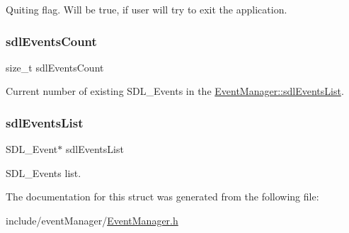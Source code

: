 Quiting flag. Will be true, if user will try to exit the application. \hypertarget{struct_event_manager_a2ef8242634939408c466f0f3f221b1cb}{}\label{struct_event_manager_a2ef8242634939408c466f0f3f221b1cb} 
\subsubsection{\texorpdfstring{sdl\+Events\+Count}{sdlEventsCount}}
{\footnotesize\ttfamily size\+\_\+t sdl\+Events\+Count}

Current number of existing S\+D\+L\+\_\+\+Events in the \hyperlink{struct_event_manager_ac563054d2cefbd8d20b1daf70eb35d78}{Event\+Manager\+::sdl\+Events\+List}. \hypertarget{struct_event_manager_ac563054d2cefbd8d20b1daf70eb35d78}{}\label{struct_event_manager_ac563054d2cefbd8d20b1daf70eb35d78} 
\subsubsection{\texorpdfstring{sdl\+Events\+List}{sdlEventsList}}
{\footnotesize\ttfamily S\+D\+L\+\_\+\+Event$\ast$ sdl\+Events\+List}

S\+D\+L\+\_\+\+Events list. 

The documentation for this struct was generated from the following file\+:\begin{DoxyCompactItemize}
\item 
include/event\+Manager/\hyperlink{_event_manager_8h}{Event\+Manager.\+h}\end{DoxyCompactItemize}

